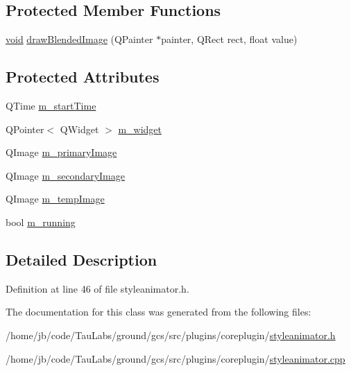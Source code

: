 \subsection*{\-Protected \-Member \-Functions}
\begin{DoxyCompactItemize}
\item 
\hyperlink{group___u_a_v_objects_plugin_ga444cf2ff3f0ecbe028adce838d373f5c}{void} \hyperlink{group___core_plugin_ga103d41217066f9b6877a6c83e493f546}{draw\-Blended\-Image} (\-Q\-Painter $\ast$painter, \-Q\-Rect rect, float value)
\end{DoxyCompactItemize}
\subsection*{\-Protected \-Attributes}
\begin{DoxyCompactItemize}
\item 
\-Q\-Time \hyperlink{group___core_plugin_gab32f9df13e3d8f25c36459622310803b}{m\-\_\-start\-Time}
\item 
\-Q\-Pointer$<$ \-Q\-Widget $>$ \hyperlink{group___core_plugin_ga93de3ff345a140e523056a0ccb332f3b}{m\-\_\-widget}
\item 
\-Q\-Image \hyperlink{group___core_plugin_gafa890764761bd5b4427837a59aa5074c}{m\-\_\-primary\-Image}
\item 
\-Q\-Image \hyperlink{group___core_plugin_ga75f12d898f20a6f11f71abe32ba0798d}{m\-\_\-secondary\-Image}
\item 
\-Q\-Image \hyperlink{group___core_plugin_ga7df3423cfde9af76852c271e0fe37991}{m\-\_\-temp\-Image}
\item 
bool \hyperlink{group___core_plugin_gaff01511bc96b0109ced0a5a4b788f7b0}{m\-\_\-running}
\end{DoxyCompactItemize}


\subsection{\-Detailed \-Description}


\-Definition at line 46 of file styleanimator.\-h.



\-The documentation for this class was generated from the following files\-:\begin{DoxyCompactItemize}
\item 
/home/jb/code/\-Tau\-Labs/ground/gcs/src/plugins/coreplugin/\hyperlink{styleanimator_8h}{styleanimator.\-h}\item 
/home/jb/code/\-Tau\-Labs/ground/gcs/src/plugins/coreplugin/\hyperlink{styleanimator_8cpp}{styleanimator.\-cpp}\end{DoxyCompactItemize}
